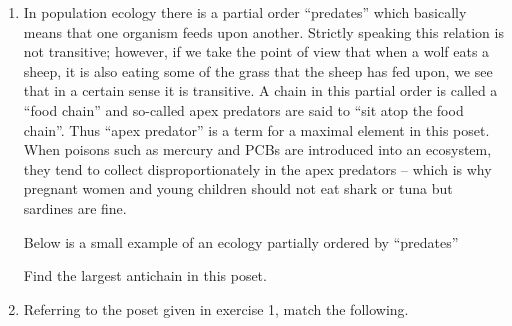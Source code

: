 \begin{enumerate}
\item In population ecology there is a partial order ``predates''
which basically means that one organism feeds upon another.  Strictly
speaking this relation is not transitive; however, if we take the point
of view that when a wolf eats a sheep, it is also eating some of the grass
that the sheep has fed upon, we see that in a certain sense it is transitive.
A chain in this partial order is called a ``food chain'' and so-called 
apex predators are said to ``sit atop the food chain''.  Thus ``apex 
predator'' is a term for a maximal element in this poset.   When poisons
such as mercury and PCBs are introduced into an ecosystem, they tend to
collect disproportionately in the apex predators -- which is why pregnant
women and young children should not eat shark or tuna but sardines 
are fine.

Below is a small example of an ecology partially ordered by ``predates''

\begin{center}

\end{center}

Find the largest antichain in this poset.

\newpage

\item Referring to the poset given in exercise 1, match the following.


\end{enumerate}
